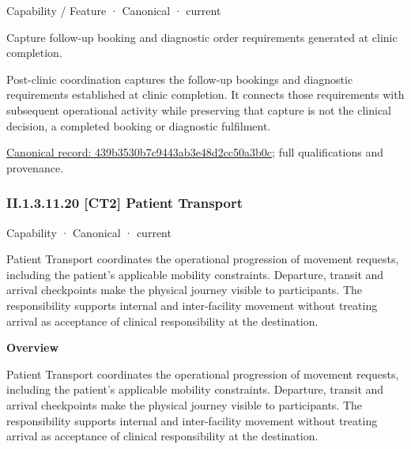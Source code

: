 \label{element:439b3530b7c9443ab3e48d2cc50a3b0c}
{\small Capability / Feature · Canonical · current}\par

Capture follow-up booking and diagnostic order requirements generated at clinic completion.



Post-clinic coordination captures the follow-up bookings and diagnostic requirements established at clinic completion. It connects those requirements with subsequent operational activity while preserving that capture is not the clinical decision, a completed booking or diagnostic fulfilment.


{\footnotesize \href{../../../../continuum/strategy/capability/feature/439b3530b7c9443ab3e48d2cc50a3b0c.md}{Canonical record: 439b3530b7c9443ab3e48d2cc50a3b0c}; full qualifications and provenance.}\par
\subsubsection*{II.1.3.11.20 [CT2] Patient Transport}
\label{navigation:II.1.3.11.20}

\label{element:6041d7c0cc5d4519aaea584bb4e6d365}
{\small Capability · Canonical · current}\par

Patient Transport coordinates the operational progression of movement requests, including the patient's applicable mobility constraints. Departure, transit and arrival checkpoints make the physical journey visible to participants. The responsibility supports internal and inter-facility movement without treating arrival as acceptance of clinical responsibility at the destination.



\textbf{Overview}



Patient Transport coordinates the operational progression of movement requests, including the patient's applicable mobility constraints. Departure, transit and arrival checkpoints make the physical journey visible to participants. The responsibility supports internal and inter-facility movement without treating arrival as acceptance of clinical responsibility at the destination.



